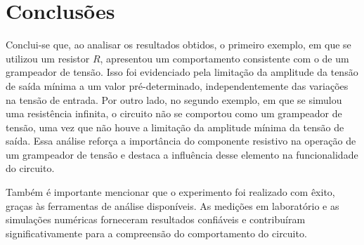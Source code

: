 \section{Conclusões}

Conclui-se que, ao analisar os resultados obtidos, o primeiro exemplo, em que se utilizou um resistor $R$, apresentou um comportamento consistente com o de um grampeador de tensão. Isso foi evidenciado pela limitação da amplitude da tensão de saída mínima a um valor pré-determinado, independentemente das variações na tensão de entrada. Por outro lado, no segundo exemplo, em que se simulou uma resistência infinita, o circuito não se comportou como um grampeador de tensão, uma vez que não houve a limitação da amplitude mínima da tensão de saída. Essa análise reforça a importância do componente resistivo na operação de um grampeador de tensão e destaca a influência desse elemento na funcionalidade do circuito.

Também é importante mencionar que o experimento foi realizado com êxito, graças às ferramentas de análise disponíveis. As medições em laboratório e as simulações numéricas forneceram resultados confiáveis e contribuíram significativamente para a compreensão do comportamento do circuito.